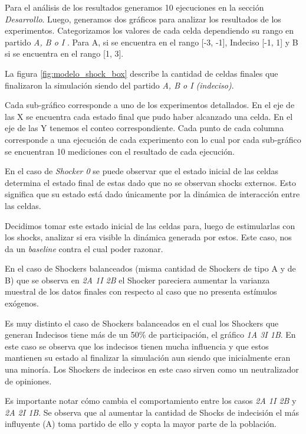 Para el análisis de los resultados generamos 10 ejecuciones 
en la sección \textit{Desarrollo}.
Luego, generamos dos gráficos para analizar los resultados de los experimentos.
Categorizamos los valores de cada celda dependiendo su rango en partido
\textit{A, B o I }. Para A, si se encuentra en el rango [-3, -1], Indeciso [-1, 1]  y B si se encuentra en el rango [1, 3].

La figura \ref{fig:modelo_shock_box} describe la cantidad de celdas finales que
finalizaron la simulación siendo del partido \textit{A, B o I (indeciso)}.

Cada sub-gráfico corresponde a uno de los experimentos detallados. En el eje de
las X se encuentra cada estado final que pudo haber alcanzado una celda. En el
eje de las Y tenemos el conteo correspondiente.  Cada punto de cada columna
corresponde a una ejecución de cada experimento con lo cual por cada
sub-gráfico se encuentran 10 mediciones con el resultado de cada ejecución.


En el caso de \textit{Shocker 0} se puede observar que el estado inicial de las
celdas determina el estado final de estas dado que no se observan shocks
externos. Esto significa que su estado está dado únicamente por la dinámica de
interacción entre las celdas.

Decidimos tomar este estado inicial de las celdas para, luego de estimularlas
con los shocks, analizar si era visible la dinámica generada por estos.
Este caso, nos da un \textit{baseline} contra el cual poder razonar.

En el caso de Shockers balanceados (misma cantidad de Shockers de tipo A  y de
B) que se observa en \textit{2A 1I 2B} el Shocker
pareciera aumentar la varianza muestral de los datos finales con respecto al
caso que no presenta estímulos exógenos.

Es muy distinto el caso de Shockers balanceados en el cual los Shockers que generan
Indecisos tiene más de un 50\% de participación, el gráfico \textit{1A 3I 1B}.
En este caso se observa que los indecisos tienen mucha influencia y que estos
mantienen su estado al finalizar la simulación aun siendo que inicialmente eran una minoría.
Los Shockers de indecisos en este caso sirven como un neutralizador de opiniones.

Es importante notar cómo cambia el comportamiento entre los casos \textit{2A 1I 2B} y \textit{2A 2I 1B}. Se observa que al aumentar la cantidad de Shocks de indecisión el más influyente (A) toma partido de ello y copta la mayor parte de la población.




